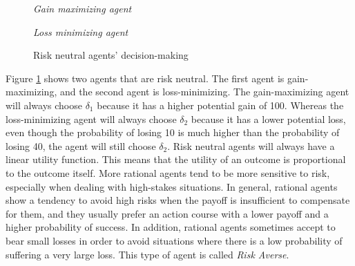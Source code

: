 \begin{figure}[H]
    \centering
    \begin{minipage}{.5\textwidth}
      \centering
        
        \textit{Gain maximizing agent}
    \end{minipage}%
    \begin{minipage}{.5\textwidth}
      \centering
        
        \textit{Loss minimizing agent}
    \end{minipage}
    \caption{Risk neutral agents' decision-making}
    \label{fig:risk-neutral}
\end{figure}

Figure \ref{fig:risk-neutral} shows two agents that are risk neutral. The first agent is gain-maximizing, and the second agent is loss-minimizing. The gain-maximizing agent will always choose $\delta_1$ because it has a higher potential gain of 100. Whereas the loss-minimizing agent will always choose $\delta_2$ because it has a lower potential loss, even though the probability of losing 10 is much higher than the probability of losing 40, the agent will still choose $\delta_2$. Risk neutral agents will always have a linear utility function. This means that the utility of an outcome is proportional to the outcome itself. More rational agents tend to be more sensitive to risk, especially when dealing with high-stakes situations. In general, rational agents show a tendency to avoid high risks when the payoff is insufficient to compensate for them, and they usually prefer an action course with a lower payoff and a higher probability of success. In addition, rational agents sometimes accept to bear small losses in order to avoid situations where there is a low probability of suffering a very large loss. This type of agent is called \textit{Risk Averse}.

